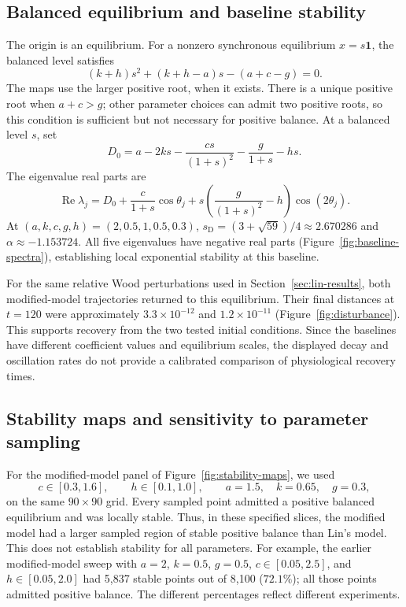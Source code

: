 \documentclass{article}
\begin{document}
\subsection{Balanced equilibrium and baseline stability}
\label{sec:modified-stability}
The origin is an equilibrium. For a nonzero synchronous equilibrium
$x=s\mathbf{1}$, the balanced level satisfies
\begin{equation}
 (k+h)s^2+(k+h-a)s-(a+c-g)=0.
 \label{eq:modified-balance}
\end{equation}
The maps use the larger positive root, when it exists. There is a unique
positive root when $a+c>g$; other parameter choices can admit two positive
roots, so this condition is sufficient but not necessary for positive
balance. At a balanced level $s$, set
\[
 D_0=a-2ks-\frac{cs}{(1+s)^2}-\frac{g}{1+s}-hs.
\]
The eigenvalue real parts are
\begin{equation}
 \operatorname{Re}\lambda_j
 =D_0+\frac{c}{1+s}\cos\theta_j
       +s\left(\frac{g}{(1+s)^2}-h\right)\cos(2\theta_j).
 \label{eq:modified-spectrum}
\end{equation}
At $(a,k,c,g,h)=(2,0.5,1,0.5,0.3)$,
$s_{\mathrm D}=(3+\sqrt{59})/4\approx2.670286$ and
$\alpha\approx-1.153724$. All five eigenvalues have negative real parts
(Figure~\ref{fig:baseline-spectra}), establishing local exponential
stability at this baseline.

For the same relative Wood perturbations used in
Section~\ref{sec:lin-results}, both modified-model trajectories returned
to this equilibrium. Their final distances at $t=120$ were approximately
$3.3\times10^{-12}$ and $1.2\times10^{-11}$
(Figure~\ref{fig:disturbance}). This supports recovery from the two tested
initial conditions. Since the baselines have different coefficient values
and equilibrium scales, the displayed decay and oscillation rates do not
provide a calibrated comparison of physiological recovery times.

\subsection{Stability maps and sensitivity to parameter sampling}
For the modified-model panel of Figure~\ref{fig:stability-maps}, we used
\begin{equation}
 c\in[0.3,1.6],\qquad h\in[0.1,1.0],\qquad
 a=1.5,\quad k=0.65,\quad g=0.3,
 \label{eq:modified-sweep}
\end{equation}
on the same $90\times90$ grid. Every sampled point admitted a positive
balanced equilibrium and was locally stable. Thus, in these specified
slices, the modified model had a larger sampled region of stable positive
balance than Lin's model. This does not establish stability for all
parameters. For example, the earlier modified-model sweep with
$a=2$, $k=0.5$, $g=0.5$, $c\in[0.05,2.5]$, and $h\in[0.05,2.0]$
had 5,837 stable points out of 8,100 ($72.1\%$); all those points admitted
positive balance. The different percentages reflect different experiments.
\end{document}
